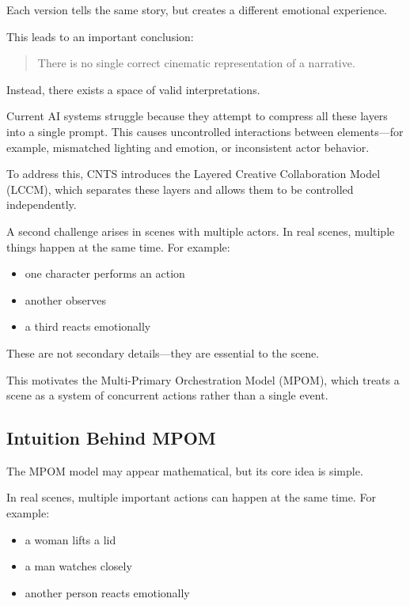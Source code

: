 \documentclass[preprints,article,submit,pdftex,moreauthors,accept]{Definitions/mdpi}
\begin{document}
Each version tells the same story, but creates a different emotional experience.

This leads to an important conclusion:

\begin{quote}
There is no single correct cinematic representation of a narrative.
\end{quote}

Instead, there exists a space of valid interpretations.

Current AI systems struggle because they attempt to compress all these layers into a single prompt. This causes uncontrolled interactions between elements—for example, mismatched lighting and emotion, or inconsistent actor behavior.

To address this, CNTS introduces the Layered Creative Collaboration Model (LCCM), which separates these layers and allows them to be controlled independently.

A second challenge arises in scenes with multiple actors. In real scenes, multiple things happen at the same time. For example:

\begin{itemize}
    \item one character performs an action
    \item another observes
    \item a third reacts emotionally
\end{itemize}

These are not secondary details—they are essential to the scene.

This motivates the Multi-Primary Orchestration Model (MPOM), which treats a scene as a system of concurrent actions rather than a single event.
\subsection{Intuition Behind MPOM}

The MPOM model may appear mathematical, but its core idea is simple.

In real scenes, multiple important actions can happen at the same time. For example:

\begin{itemize}
    \item a woman lifts a lid
    \item a man watches closely
    \item another person reacts emotionally
\end{itemize}
\end{document}
